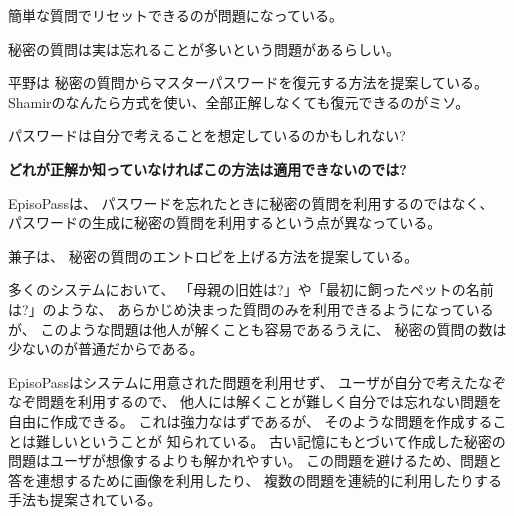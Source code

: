 \documentclass[twoside]{wiss}
\begin{document}
簡単な質問でリセットできるのが問題になっている。

秘密の質問は実は忘れることが多いという問題があるらしい。

平野\cite{平野亮:2011-11-07}は
秘密の質問からマスターパスワードを復元する方法を提案している。
Shamirのなんたら方式を使い、全部正解しなくても復元できるのがミソ。

パスワードは自分で考えることを想定しているのかもしれない?

\textbf{どれが正解か知っていなければこの方法は適用できないのでは?}


EpisoPassは、
パスワードを忘れたときに秘密の質問を利用するのではなく、
パスワードの生成に秘密の質問を利用するという点が異なっている。

兼子は、
秘密の質問のエントロピを上げる方法を提案している\cite{Kaneko}。

多くのシステムにおいて、
「母親の旧姓は?」や「最初に飼ったペットの名前は?」のような、
あらかじめ決まった質問のみを利用できるようになっているが、
このような問題は他人が解くことも容易であるうえに、
秘密の質問の数は少ないのが普通だからである\cite{Rabkin:2008:PKQ:1408664.1408667}。

EpisoPassはシステムに用意された問題を利用せず、
ユーザが自分で考えたなぞなぞ問題を利用するので、
他人には解くことが難しく自分では忘れない問題を自由に作成できる。
これは強力なはずであるが、
そのような問題を作成することは難しいということが
知られている\cite{Just:2009:PCC:1572532.1572543}\cite{Schechter:2009:NSM:1607723.1608145}。
%
%
%
古い記憶にもとづいて作成した秘密の問題はユーザが想像するよりも解かれやすい。
この問題を避けるため、問題と答を連想するために画像を利用したり、
複数の問題を連続的に利用したりする手法も提案されている\cite{Renaud:2010:PQE:2146303.2146318}。

\end{document}

